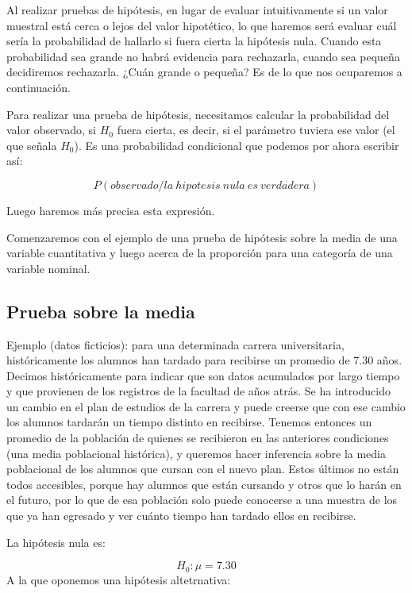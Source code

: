 \documentclass[]{book}
\begin{document}
Al realizar pruebas de hipótesis, en lugar de evaluar intuitivamente si
un valor muestral está cerca o lejos del valor hipotético, lo que
haremos será evaluar cuál sería la probabilidad de hallarlo si fuera
cierta la hipótesis nula. Cuando esta probabilidad sea grande no habrá
evidencia para rechazarla, cuando sea pequeña decidiremos rechazarla.
¿Cuán grande o pequeña? Es de lo que nos ocuparemos a continuación.

Para realizar una prueba de hipótesis, necesitamos calcular la
probabilidad del valor observado, si \(H_{0}\) fuera cierta, es decir, si el
parámetro tuviera ese valor (el que señala \(H_{0}\)). Es una probabilidad
condicional que podemos por ahora escribir así:

\[P(observado/la\:hipotesis\:nula\:es\:verdadera)\]

Luego haremos más precisa esta expresión.

Comenzaremos con el ejemplo de una prueba de hipótesis sobre la media de una variable cuantitativa y luego acerca de la proporción para una
categoría de una variable nominal.

\hypertarget{prueba-sobre-la-media}{%
\subsection{Prueba sobre la media}\label{prueba-sobre-la-media}}

Ejemplo (datos ficticios): para una determinada carrera universitaria,
históricamente los alumnos han tardado para recibirse un promedio de
7.30 años. Decimos históricamente para indicar que son datos acumulados
por largo tiempo y que provienen de los registros de la facultad de años atrás. Se ha introducido un cambio en el plan de estudios de la carrera
y puede creerse que con ese cambio los alumnos tardarán un tiempo
distinto en recibirse. Tenemos entonces un promedio de la población de
quienes se recibieron en las anteriores condiciones (una media
poblacional histórica), y queremos hacer inferencia sobre la media
poblacional de los alumnos que cursan con el nuevo plan. Estos últimos
no están todos accesibles, porque hay alumnos que están cursando y otros
que lo harán en el futuro, por lo que de esa población solo puede
conocerse a una muestra de los que ya han egresado y ver cuánto tiempo
han tardado ellos en recibirse.

La hipótesis nula es:

\[H_{0}:\mu = 7.30\]
A la que oponemos una hipótesis altetrnativa:
\end{document}
